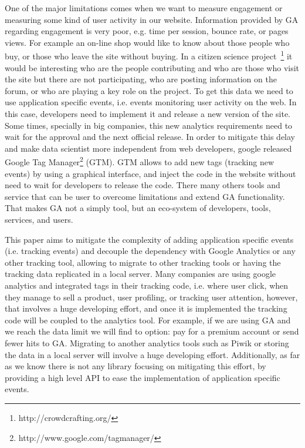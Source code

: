 \documentclass{article}
\begin{document}
One of the major limitations comes when we want to measure engagement or measuring some kind of user activity in our website. Information provided by GA regarding engagement is very poor, e.g. time per session, bounce rate, or pages views. For example an on-line shop would like to know about those people who buy, or those who leave the site without buying. In a citizen science project~\footnote{http://crowdcrafting.org/} it would be interesting who are the people contributing and who are those who visit the site but there are not participating, who are posting information on the forum, or who are playing a key role on the project. To get this data we need to use application specific events, i.e. events monitoring user activity on the web. In this case, developers need to implement it and release a new version of the site. Some times, specially in big companies, this new analytics requirements need to wait for the approval and the next official release. In order to mitigate this delay and make data scientist more independent from web developers, google released Google Tag Manager\footnote{http://www.google.com/tagmanager/} (GTM). GTM allows to add new tags (tracking new events) by using a graphical interface, and inject the code in the website without need to wait for developers to release the code. There many others tools and service that can be user to overcome limitations and extend GA functionality. That makes GA not a simply tool, but an eco-system of developers, tools, services, and users.

This paper aims to mitigate the complexity of adding application specific events (i.e. tracking events) and decouple the dependency with Google Analytics or any other tracking tool, allowing to migrate to other tracking tools or having the tracking data replicated in a local server. Many companies are using google analytics and integrated tags in their tracking code, i.e. where user click, when they manage to sell a product, user profiling, or tracking user attention, however, that involves a huge developing effort, and once it is implemented the tracking code will be coupled to the analytics tool. For example, if we are using GA and we reach the data limit we will find to option: pay for a premium account or send fewer hits to GA. Migrating to another analytics tools such as Piwik or storing the data in a local server will involve a huge developing effort. Additionally, as far as we know there is not any library focusing on mitigating this effort, by providing a high level API to ease the implementation of application specific events. 
\end{document}
